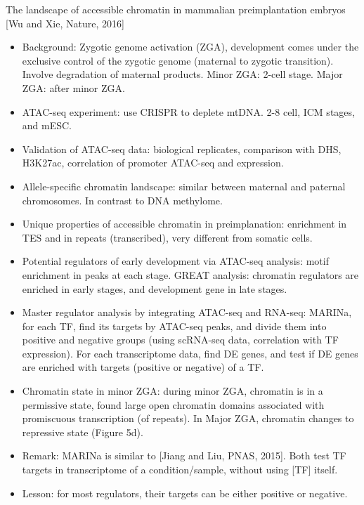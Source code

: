 \documentclass{report}
\begin{document}
The landscape of accessible chromatin in mammalian preimplantation embryos [Wu and Xie, Nature, 2016]
\begin{itemize}
	
	\item Background: Zygotic genome activation (ZGA), development comes under the exclusive control of the zygotic genome (maternal to zygotic transition). Involve degradation of maternal products. Minor ZGA: 2-cell stage. Major ZGA: after minor ZGA. 
	
	\item ATAC-seq experiment: use CRISPR to deplete mtDNA. 2-8 cell, ICM stages, and mESC. 
	
	\item Validation of ATAC-seq data: biological replicates, comparison with DHS, H3K27ac, correlation of promoter ATAC-seq and expression. 
	
	\item Allele-specific chromatin landscape: similar between maternal and paternal chromosomes. In contrast to DNA methylome. 
	
	\item Unique properties of accessible chromatin in preimplanation: enrichment in TES and in repeats (transcribed), very different from somatic cells. 
	
	\item Potential regulators of early development via ATAC-seq analysis:  motif enrichment in peaks at each stage. GREAT analysis: chromatin regulators are enriched in early stages, and development gene in late stages. 
	
	\item Master regulator analysis by integrating ATAC-seq and RNA-seq: MARINa, for each TF, find its targets by ATAC-seq peaks, and divide them into positive and negative groups (using scRNA-seq data, correlation with TF expression). For each transcriptome data, find DE genes, and test if DE genes are enriched with targets (positive or negative) of a TF. 
	
	\item Chromatin state in minor ZGA: during minor ZGA, chromatin is in a permissive state, found large open chromatin domains associated with promiscuous transcription (of repeats). In Major ZGA, chromatin changes to repressive state (Figure 5d). 
	
	\item Remark: MARINa is similar to [Jiang and Liu, PNAS, 2015]. Both test TF targets in transcriptome of a condition/sample, without using [TF] itself. 
	
	\item Lesson: for most regulators, their targets can be either positive or negative. 
\end{itemize}
\end{document}
